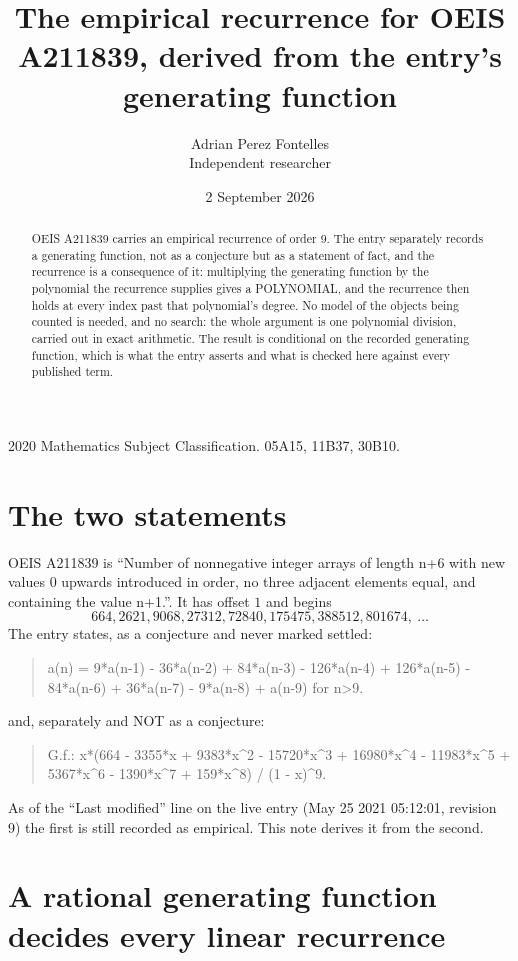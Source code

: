 \documentclass[11pt,a4paper]{article}
\title{The empirical recurrence for OEIS A211839, derived from the entry's generating function}
\author{Adrian Perez Fontelles\\ \small Independent researcher}
\date{2 September 2026}
\theoremstyle{plain}
\theoremstyle{definition}
\begin{document}
\maketitle

\begin{abstract}
OEIS A211839 carries an empirical recurrence of order $9$. The entry separately records a
generating function, not as a conjecture but as a statement of fact, and the recurrence is a
consequence of it: multiplying the generating function by the polynomial the recurrence
supplies gives a POLYNOMIAL, and the recurrence then holds at every index past that
polynomial's degree. No model of the objects being counted is needed, and no search: the
whole argument is one polynomial division, carried out in exact arithmetic. The result is
conditional on the recorded generating function, which is what the entry asserts and what is
checked here against every published term.
\end{abstract}

\noindent\small 2020 Mathematics Subject Classification. 05A15, 11B37, 30B10.\normalsize

\section{The two statements}

OEIS A211839 is ``Number of nonnegative integer arrays of length n+6 with new values 0 upwards introduced in order, no three adjacent elements equal, and containing the value n+1.''. It has offset $1$ and begins
\[
664, 2621, 9068, 27312, 72840, 175475, 388512, 801674,\ \dots
\]
The entry states, as a conjecture and never marked settled:
\begin{quote}
a(n) = 9*a(n-1) - 36*a(n-2) + 84*a(n-3) - 126*a(n-4) + 126*a(n-5) - 84*a(n-6) + 36*a(n-7) - 9*a(n-8) + a(n-9) for n>9.
\end{quote}
and, separately and NOT as a conjecture:
\begin{quote}
G.f.: x*(664 - 3355*x + 9383*x\^{}2 - 15720*x\^{}3 + 16980*x\^{}4 - 11983*x\^{}5 + 5367*x\^{}6 - 1390*x\^{}7 + 159*x\^{}8) / (1 - x)\^{}9.
\end{quote}
As of the ``Last modified'' line on the live entry (May 25 2021 05:12:01, revision 9) the first is still
recorded as empirical. This note derives it from the second.

\section{A rational generating function decides every linear recurrence}
\end{document}
